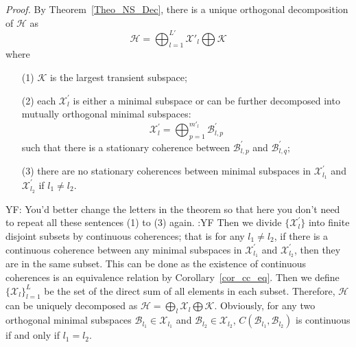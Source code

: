 \documentclass[journal]{IEEEtran}
\def\h{\ensuremath{\mathcal{H}}}
\def\k{\ensuremath{\mathcal{K}}}
\def\x{\ensuremath{\mathcal{X}}}
\def\b{\ensuremath{\mathcal{B}}}
\def\k{\mathcal{K}}
\newcommand{\authorComment}[3]{\color{#1}#2: {#3} :#2\color{black}}
\newcommand{\yf}[1]{\authorComment{blue}{YF}{#1}}
\begin{document}
{\it Proof.} By Theorem~\ref{Theo_NS_Dec}, there is a unique  orthogonal decomposition of $\h$ as
  $$\h=\bigoplus_{l=1}^{L'}\x'_l\bigoplus \k$$
  where \begin{itemize}
    \item[(1)] $\k$ is the largest transient subspace;
    \item[(2)] each $\x_l^{'}$ is either a minimal subspace or can be further decomposed into mutually orthogonal minimal subspaces:
    $$\x_l^{'}=\bigoplus_{p=1}^{m'_l}\b_{l,p}^{'}$$%
    such that there is a stationary coherence between $\b_{l,p}^{'}$ and $\b_{l,q}^{'};$
    \item[(3)] there are no stationary coherences between minimal subspaces in $\x_{l_1}^{'}$ and $\x_{l_2}^{'}$ if $l_{1}\not =l_2.$
      \end{itemize}
      \yf{You'd better change the letters in the theorem so that here you don't need to repeat all these sentences (1) to (3) again.}
      Then we divide $\{\x_l^{'}\}$ into finite disjoint subsets by continuous coherences; that  is for any $l_1\not =l_2$, if there is a continuous coherence between any minimal subspaces in $\x_{l_1}^{'}$ and $\x_{l_2}^{'}$, then they are in the same subset. This can be done as the existence of continuous coherences is an equivalence relation by Corollary~\ref{cor_cc_eq}. Then we define $\{\x_l\}_{l=1}^{L}$ be the set of the direct sum  of all elements in each subset.  Therefore, $\h$ can be uniquely decomposed as $\h=\bigoplus_l\x_l\bigoplus \k.$ Obviously, for any two orthogonal  minimal subspaces $\b_{l_1}\in\x_{l_1}$ and $\b_{l_2}\in\x_{l_2}$, $C(\b_{l_1},\b_{l_2})$ is continuous if and only if $l_1=l_2.$
\end{document}
